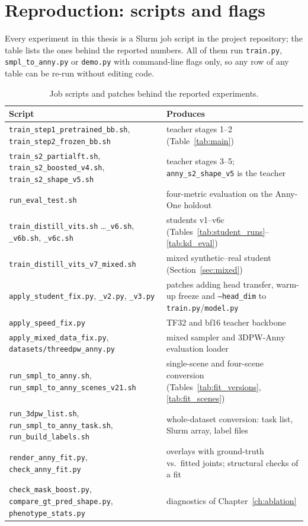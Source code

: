 \appendix

\chapter{Reproduction: scripts and flags}
\label{app:scripts}

Every experiment in this thesis is a Slurm job script in the project
repository; the table lists the ones behind the reported numbers. All of them
run \texttt{train.py}, \texttt{smpl\_to\_anny.py} or \texttt{demo.py} with
command-line flags only, so any row of any table can be re-run without
editing code.

\begin{table}[h]
\centering\small
\begin{tabular}{p{4.6cm}p{8.6cm}}
\toprule
Script & Produces \\
\midrule
\texttt{train\_step1\_pretrained\_bb.sh}, \texttt{train\_step2\_frozen\_bb.sh} & teacher stages 1--2 (Table~\ref{tab:main}) \\
\texttt{train\_s2\_partialft.sh}, \texttt{train\_s2\_boosted\_v4.sh}, \texttt{train\_s2\_shape\_v5.sh} & teacher stages 3--5; \texttt{anny\_s2\_shape\_v5} is the teacher \\
\texttt{run\_eval\_test.sh} & four-metric evaluation on the Anny-One holdout \\
\texttt{train\_distill\_vits.sh} \ldots \texttt{\_v6.sh}, \texttt{\_v6b.sh}, \texttt{\_v6c.sh} & students v1--v6c (Tables~\ref{tab:student_runs}--\ref{tab:kd_eval}) \\
\texttt{train\_distill\_vits\_v7\_mixed.sh} & mixed synthetic--real student (Section~\ref{sec:mixed}) \\
\texttt{apply\_student\_fix.py}, \texttt{\_v2.py}, \texttt{\_v3.py} & patches adding head transfer, warm-up freeze and \texttt{--head\_dim} to \texttt{train.py}/\texttt{model.py} \\
\texttt{apply\_speed\_fix.py} & TF32 and bf16 teacher backbone \\
\texttt{apply\_mixed\_data\_fix.py}, \texttt{datasets/threedpw\_anny.py} & mixed sampler and 3DPW-Anny evaluation loader \\
\texttt{run\_smpl\_to\_anny.sh}, \texttt{run\_smpl\_to\_anny\_scenes\_v21.sh} & single-scene and four-scene conversion (Tables~\ref{tab:fit_versions}, \ref{tab:fit_scenes}) \\
\texttt{run\_3dpw\_list.sh}, \texttt{run\_smpl\_to\_anny\_task.sh}, \texttt{run\_build\_labels.sh} & whole-dataset conversion: task list, Slurm array, label files \\
\texttt{render\_anny\_fit.py}, \texttt{check\_anny\_fit.py} & overlays with ground-truth vs.\ fitted joints; structural checks of a fit \\
\texttt{check\_mask\_boost.py}, \texttt{compare\_gt\_pred\_shape.py}, \texttt{phenotype\_stats.py} & diagnostics of Chapter~\ref{ch:ablation} \\
\bottomrule
\end{tabular}
\caption{Job scripts and patches behind the reported experiments.}
\label{tab:scripts}
\end{table}

